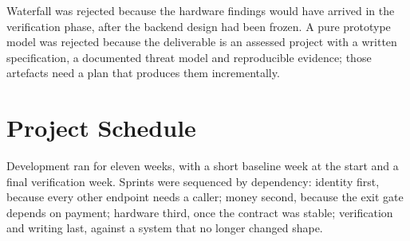 Waterfall was rejected because the hardware findings would have arrived in the
verification phase, after the backend design had been frozen. A pure prototype
model was rejected because the deliverable is an assessed project with a written
specification, a documented threat model and reproducible evidence; those artefacts
need a plan that produces them incrementally.

\section{Project Schedule}

Development ran for eleven weeks, with a short baseline week at the start and a
final verification week. Sprints were sequenced by dependency: identity first, because
every other endpoint needs a caller; money second, because the exit gate depends on
payment; hardware third, once the contract was stable; verification and writing
last, against a system that no longer changed shape.

